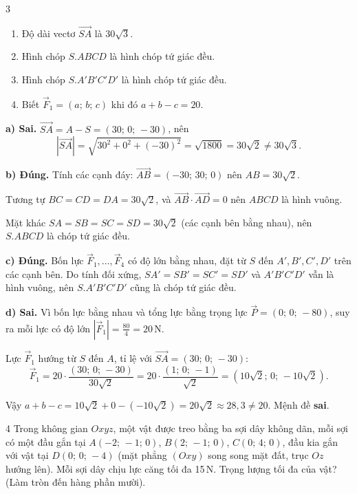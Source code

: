 \begin{baitoan}{3 \hfill {}}
\begin{enumerate}[label=\alph*), leftmargin=2em]
  \item Độ dài vectơ $\overrightarrow{SA}$ là $30\sqrt{3}$.
  \item Hình chóp $S.ABCD$ là hình chóp tứ giác đều.
  \item Hình chóp $S.A'B'C'D'$ là hình chóp tứ giác đều.
  \item Biết $\vec{F}_1 = (a;\,b;\,c)$ khi đó $a + b - c = 20$.
\end{enumerate}
\end{baitoan}

\begin{loigiai}
\textbf{a) Sai.}
$\overrightarrow{SA} = A - S = (30;\,0;\,-30)$, nên
\[ |\overrightarrow{SA}| = \sqrt{30^2 + 0^2 + (-30)^2} = \sqrt{1800} = 30\sqrt{2} \neq 30\sqrt{3}. \]

\textbf{b) Đúng.}
Tính các cạnh đáy: $\overrightarrow{AB} = (-30;\,30;\,0)$ nên $AB = 30\sqrt{2}$.

Tương tự $BC = CD = DA = 30\sqrt{2}$, và $\overrightarrow{AB} \cdot \overrightarrow{AD} = 0$ nên $ABCD$ là hình vuông.

Mặt khác $SA = SB = SC = SD = 30\sqrt{2}$ (các cạnh bên bằng nhau), nên $S.ABCD$ là chóp tứ giác đều.

\textbf{c) Đúng.}
Bốn lực $\vec{F}_1, \ldots, \vec{F}_4$ có độ lớn bằng nhau, đặt từ $S$ đến $A', B', C', D'$ trên các cạnh bên. Do tính đối xứng, $SA' = SB' = SC' = SD'$ và $A'B'C'D'$ vẫn là hình vuông, nên $S.A'B'C'D'$ cũng là chóp tứ giác đều.

\textbf{d) Sai.}
Vì bốn lực bằng nhau và tổng lực bằng trọng lực $\vec{P} = (0;\,0;\,-80)$, suy ra mỗi lực có độ lớn $|\vec{F}_1| = \frac{80}{4} = 20$\,N.

Lực $\vec{F}_1$ hướng từ $S$ đến $A$, tỉ lệ với $\overrightarrow{SA} = (30;\,0;\,-30)$:
\[ \vec{F}_1 = 20 \cdot \frac{(30;\,0;\,-30)}{30\sqrt{2}} = 20 \cdot \frac{(1;\,0;\,-1)}{\sqrt{2}} = (10\sqrt{2};\,0;\,-10\sqrt{2}). \]

Vậy $a + b - c = 10\sqrt{2} + 0 - (-10\sqrt{2}) = 20\sqrt{2} \approx 28{,}3 \neq 20$. Mệnh đề \textbf{sai}.
\end{loigiai}

\separator

\begin{baitoan}{4 \hfill {}}
Trong không gian $Oxyz$, một vật được treo bằng ba sợi dây không dãn, mỗi sợi có một đầu gắn tại $A(-2;\,-1;\,0)$, $B(2;\,-1;\,0)$, $C(0;\,4;\,0)$, đầu kia gắn với vật tại $D(0;\,0;\,-4)$ (mặt phẳng $(Oxy)$ song song mặt đất, trục $Oz$ hướng lên). Mỗi sợi dây chịu lực căng tối đa 15\,N. Trọng lượng tối đa của vật? (Làm tròn đến hàng phần mười).
\end{baitoan}

